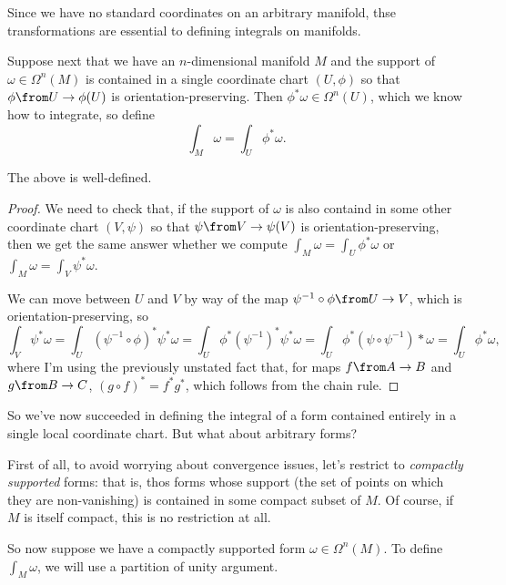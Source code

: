 Since we have no standard coordinates on an arbitrary manifold, thse transformations are essential to defining integrals on manifolds.

Suppose next that we have an $n$-dimensional manifold $M$ and the support of $\omega \in \Omega^n(M)$ is contained in a single coordinate chart $(U,\phi)$ so that $\phi \from U \to \phi(U)$ is orientation-preserving. Then $\phi^\ast \omega \in \Omega^n(U)$, which we know how to integrate, so define
\[
	\int_M\omega = \int_U \phi^\ast \omega.
\]

\begin{proposition}\label{prop:local integral well-defined}
	The above is well-defined.
\end{proposition}

\begin{proof}
	We need to check that, if the support of $\omega$ is also containd in some other coordinate chart $(V, \psi)$ so that $\psi \from V \to \psi(V)$ is orientation-preserving, then we get the same answer whether we compute $\int_M \omega = \int_U \phi^\ast \omega$ or $\int_M \omega = \int_V \psi^\ast \omega$.
	
	We can move between $U$ and $V$ by way of the map $\psi^{-1} \circ \phi \from U \to V$, which is orientation-preserving, so
	\[
		\int_V \psi^\ast \omega = \int_U(\psi^{-1} \circ \phi)^\ast \psi^\ast \omega = \int_U \phi^\ast (\psi^{-1})^\ast \psi^\ast \omega = \int_U \phi^\ast (\psi \circ \psi^{-1})\ast \omega = \int_U \phi^\ast \omega ,
	\]
	where I'm using the previously unstated fact that, for maps $f \from A \to B$ and $g \from B \to C$, $(g \circ f)^\ast = f^\ast g^\ast$, which follows from the chain rule.
\end{proof}

So we've now succeeded in defining the integral of a form contained entirely in a single local coordinate chart. But what about arbitrary forms?

First of all, to avoid worrying about convergence issues, let's restrict to \emph{compactly supported} forms: that is, thos forms whose support (the set of points on which they are non-vanishing) is contained in some compact subset of $M$. Of course, if $M$ is itself compact, this is no restriction at all.

So now suppose we have a compactly supported form $\omega \in \Omega^n(M)$. To define $\int_M \omega$, we will use a partition of unity argument.

